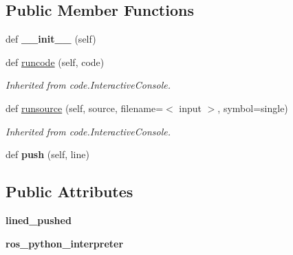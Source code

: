 \subsection*{Public Member Functions}
\begin{DoxyCompactItemize}
\item 
def {\bfseries \+\_\+\+\_\+init\+\_\+\+\_\+} (self)\hypertarget{classros_1_1shell__client_1_1DynamicGraphInteractiveConsole_a55c1e79124ad87114bd27c5f1b7550bf}{}\label{classros_1_1shell__client_1_1DynamicGraphInteractiveConsole_a55c1e79124ad87114bd27c5f1b7550bf}

\item 
def \hyperlink{classros_1_1shell__client_1_1DynamicGraphInteractiveConsole_ae2781aac94d439abbdc158961562342f}{runcode} (self, code)
\begin{DoxyCompactList}\small\item\em Inherited from code.\+Interactive\+Console. \end{DoxyCompactList}\item 
def \hyperlink{classros_1_1shell__client_1_1DynamicGraphInteractiveConsole_afe6b432e407d107434ccc105a99f7746}{runsource} (self, source, filename=\textquotesingle{}$<$ input $>$\textquotesingle{}, symbol=\textquotesingle{}single\textquotesingle{})
\begin{DoxyCompactList}\small\item\em Inherited from code.\+Interactive\+Console. \end{DoxyCompactList}\item 
def {\bfseries push} (self, line)\hypertarget{classros_1_1shell__client_1_1DynamicGraphInteractiveConsole_aa7e3a07d2def8b5266cb5925bb049d9f}{}\label{classros_1_1shell__client_1_1DynamicGraphInteractiveConsole_aa7e3a07d2def8b5266cb5925bb049d9f}

\end{DoxyCompactItemize}
\subsection*{Public Attributes}
\begin{DoxyCompactItemize}
\item 
{\bfseries lined\+\_\+pushed}\hypertarget{classros_1_1shell__client_1_1DynamicGraphInteractiveConsole_a77621fd2201b8806aa151e249246e47a}{}\label{classros_1_1shell__client_1_1DynamicGraphInteractiveConsole_a77621fd2201b8806aa151e249246e47a}

\item 
{\bfseries ros\+\_\+python\+\_\+interpreter}\hypertarget{classros_1_1shell__client_1_1DynamicGraphInteractiveConsole_ad84d4c48a16b1fe47a923a02acdd41c3}{}\label{classros_1_1shell__client_1_1DynamicGraphInteractiveConsole_ad84d4c48a16b1fe47a923a02acdd41c3}

\end{DoxyCompactItemize}



